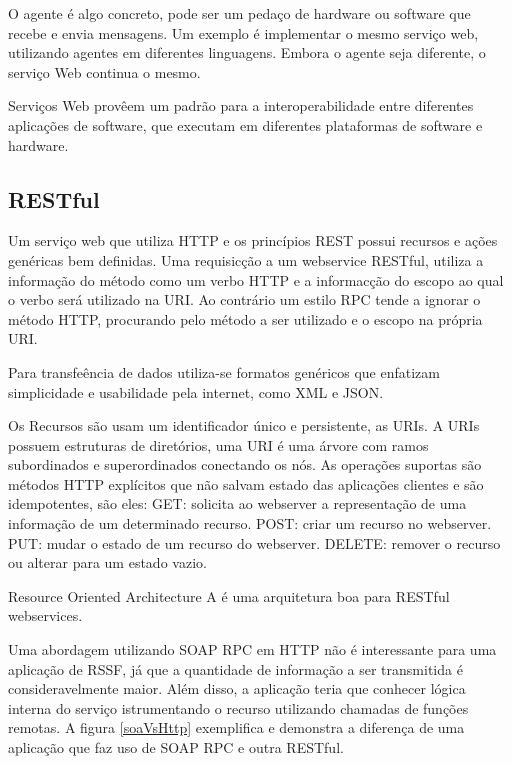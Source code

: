 O agente \'e algo concreto, pode ser um peda\c{c}o de hardware ou software que recebe e envia mensagens. Um exemplo \'e implementar o mesmo servi\c{c}o web, utilizando agentes em diferentes linguagens. Embora o agente seja diferente, o servi\c{c}o Web continua o mesmo.

Servi\c{c}os Web prov\^eem um padr\~ao para a interoperabilidade entre diferentes aplica\c{c}\~oes de software, que executam em diferentes plataformas de software e hardware.

\subsection{RESTful}

Um servi\c{c}o web que utiliza HTTP e os princ\'ipios REST possui recursos e a\c{c}\~oes gen\'ericas bem definidas. Uma requisic\c{c}\~ao a um webservice RESTful, utiliza a informa\c{c}\~ao do m\'etodo como um verbo HTTP e a informac\c{c}\~ao do escopo ao qual o verbo ser\'a utilizado na URI. Ao contr\'ario um estilo RPC tende a ignorar o m\'etodo HTTP, procurando pelo m\'etodo a ser utilizado e o escopo na pr\'opria URI. \cite{rest}

Para transfe\^encia de dados utiliza-se formatos gen\'ericos que enfatizam simplicidade e usabilidade pela internet, como XML e JSON.

Os Recursos s\~ao usam um identificador \'unico e persistente, as URIs. A URIs possuem estruturas de diret\'orios, uma URI \'e uma \'arvore com ramos subordinados e superordinados conectando os n\'os. As opera\c{c}\~oes suportas s\~ao m\'etodos HTTP expl\'icitos que n\~ao salvam estado das aplica\c{c}\~oes clientes e s\~ao idempotentes, s\~ao eles:
GET: solicita ao webserver a representa\c{c}\~ao de uma informa\c{c}\~ao de um determinado recurso.
POST: criar um recurso no webserver.
PUT: mudar o estado de um recurso do webserver.
DELETE: remover o recurso ou alterar para um estado vazio.

Resource Oriented Architecture A \'e uma arquitetura boa para RESTful webservices. \cite{richardson2008restful}

Uma abordagem utilizando SOAP RPC em HTTP n\~ao \'e interessante para uma aplica\c{c}\~ao de RSSF, j\'a que a quantidade de informa\c{c}\~ao a ser transmitida \'e consideravelmente maior. Al\'em disso, a aplica\c{c}\~ao teria que conhecer l\'ogica interna do servi\c{c}o istrumentando o recurso utilizando chamadas de fun\c{c}\~oes remotas. A figura \ref{soaVsHttp} exemplifica e demonstra a diferen\c{c}a de uma aplica\c{c}\~ao que faz uso de SOAP RPC e outra RESTful.\cite{richardson2008restful}


